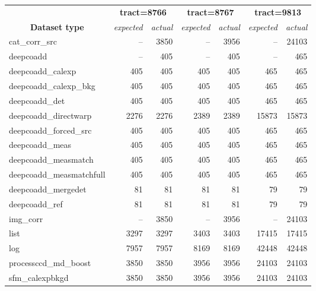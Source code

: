 \begin{table}[h]
	\caption{
		File counts. Expected values came from corresponding weekly RC
		exections. Symbol \dag{} dentoes dataset types which differs from
		weekly execution and \ddag{} indicates DESDM specific dataset types.
	}
	\label{tab:count}
	\small
	\begin{longtable}{lrrrrrr}
		\hline\hline
		                                          &
		\multicolumn{2}{c}{\textbf{tract=8766}}   &
		\multicolumn{2}{c}{\textbf{tract=8767}}   &
		\multicolumn{2}{c}{\textbf{tract=9813}}   \\
		\multicolumn{1}{c}{\textbf{Dataset type}} &
		\multicolumn{1}{c}{\textit{expected}}     &
		\multicolumn{1}{c}{\textit{actual}}       &
		\multicolumn{1}{c}{\textit{expected}}     &
		\multicolumn{1}{c}{\textit{actual}}       &
		\multicolumn{1}{c}{\textit{expected}}     &
		\multicolumn{1}{c}{\textit{actual}}       \\
		\hline\hline
		cat\_corr\_src\dag & -- & 3850 & -- & 3956 & -- & 24103 \\
		deepcoadd\dag & -- & 405 & -- & 405 & -- & 465 \\
		deepcoadd\_calexp & 405 & 405 & 405 & 405 & 465 & 465 \\
		deepcoadd\_calexp\_bkg & 405 & 405 & 405 & 405 & 465 & 465 \\
		deepcoadd\_det & 405 & 405 & 405 & 405 & 465 & 465 \\
		deepcoadd\_directwarp & 2276 & 2276 & 2389 & 2389 & 15873 & 15873 \\
		deepcoadd\_forced\_src & 405 & 405 & 405 & 405 & 465 & 465 \\
		deepcoadd\_meas & 405 & 405 & 405 & 405 & 465 & 465 \\
		deepcoadd\_measmatch & 405 & 405 & 405 & 405 & 465 & 465 \\
		deepcoadd\_measmatchfull & 405 & 405 & 405 & 405 & 465 & 465 \\
		deepcoadd\_mergedet & 81 & 81 & 81 & 81 & 79 & 79 \\
		deepcoadd\_ref & 81 & 81 & 81 & 81 & 79 & 79 \\
		img\_corr\dag & -- & 3850 & -- & 3956 & -- & 24103 \\
		list\ddag & 3297 & 3297 & 3403 & 3403 & 17415 & 17415 \\
		log\ddag & 7957 & 7957 & 8169 & 8169 & 42448 & 42448 \\
		processccd\_md\_boost & 3850 & 3850 & 3956 & 3956 & 24103 & 24103 \\
		sfm\_calexpbkgd & 3850 & 3850 & 3956 & 3956 & 24103 & 24103 \\

\end{longtable}
\end{table}
